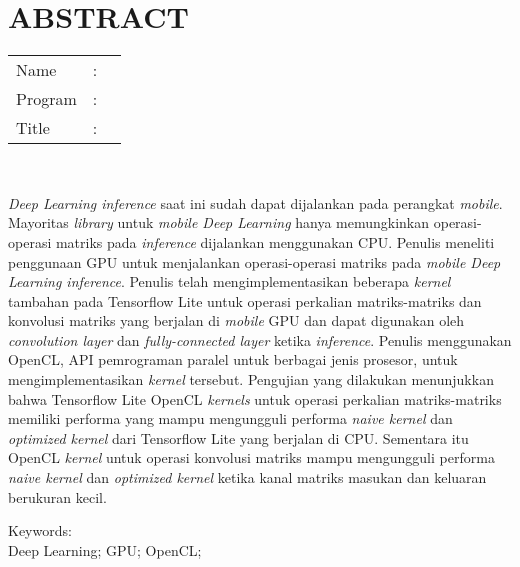 %
%
%

\chapter*{ABSTRACT}

\vspace*{0.2cm}

\noindent \begin{tabular}{l l p{11.0cm}}
	Name&: & \penulis \\
	Program&: & \programInggris \\
	Title&: & \judulInggris \\
\end{tabular} \\ 

\vspace*{0.5cm}

\noindent 
\textit{Deep Learning inference} saat ini sudah dapat dijalankan pada perangkat \textit{mobile}. Mayoritas \textit{library} untuk \textit{mobile Deep Learning} hanya memungkinkan operasi-operasi matriks pada \textit{inference} dijalankan menggunakan CPU. Penulis meneliti penggunaan GPU untuk menjalankan operasi-operasi matriks pada \textit{mobile Deep Learning inference}. Penulis telah mengimplementasikan beberapa \textit{kernel} tambahan pada Tensorflow Lite untuk operasi perkalian matriks-matriks dan konvolusi matriks yang berjalan di \textit{mobile} GPU dan dapat digunakan oleh \textit{convolution layer} dan \textit{fully-connected layer} ketika \textit{inference}. Penulis menggunakan OpenCL, API pemrograman paralel untuk berbagai jenis prosesor, untuk mengimplementasikan \textit{kernel} tersebut. Pengujian yang dilakukan menunjukkan bahwa Tensorflow Lite OpenCL \textit{kernels} untuk operasi perkalian matriks-matriks memiliki performa yang mampu mengungguli performa \textit{naive kernel} dan \textit{optimized kernel} dari Tensorflow Lite yang berjalan di CPU. Sementara itu OpenCL \textit{kernel} untuk operasi konvolusi matriks mampu mengungguli performa \textit{naive kernel} dan \textit{optimized kernel} ketika kanal matriks masukan dan keluaran berukuran kecil.
\\

\vspace*{0.2cm}

\noindent Keywords: \\ 
\noindent Deep Learning; GPU; OpenCL; \\

\newpage